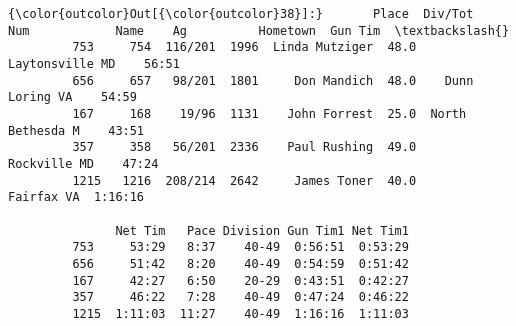\documentclass[11pt]{article}
\begin{document}
\begin{Verbatim}[commandchars=\\\{\}]
{\color{outcolor}Out[{\color{outcolor}38}]:}       Place  Div/Tot   Num            Name    Ag          Hometown  Gun Tim  \textbackslash{}
         753     754  116/201  1996  Linda Mutziger  48.0   Laytonsville MD    56:51   
         656     657   98/201  1801     Don Mandich  48.0    Dunn Loring VA    54:59   
         167     168    19/96  1131    John Forrest  25.0  North Bethesda M    43:51   
         357     358   56/201  2336    Paul Rushing  49.0      Rockville MD    47:24   
         1215   1216  208/214  2642     James Toner  40.0        Fairfax VA  1:16:16   
         
               Net Tim   Pace Division Gun Tim1 Net Tim1  
         753     53:29   8:37    40-49  0:56:51  0:53:29  
         656     51:42   8:20    40-49  0:54:59  0:51:42  
         167     42:27   6:50    20-29  0:43:51  0:42:27  
         357     46:22   7:28    40-49  0:47:24  0:46:22  
         1215  1:11:03  11:27    40-49  1:16:16  1:11:03  
\end{Verbatim}
            
\end{document}
